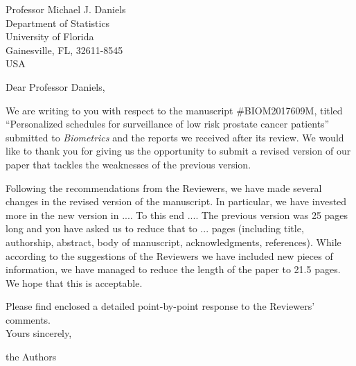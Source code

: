 \documentclass[a4paper, 11pt]{letter}
\begin{document}
\begin{letter}{Professor Michael J. Daniels\\
Department of Statistics\\
University of Florida\\
Gainesville, FL, 32611-8545\\
USA}

\address{Department of Biostatistics\\
Erasmus University Medical Center\\PO Box 2040, 3000 CA Rotterdam\\ the Netherlands
}

\opening{Dear Professor Daniels,}

We are writing to you with respect to the manuscript \#BIOM2017609M, titled ``Personalized schedules for surveillance of low risk prostate cancer patients''  submitted to \emph{Biometrics} and the reports we received after its review. We would like to thank you for giving us the opportunity to submit a revised version of our paper that tackles the weaknesses of the previous version.

Following the recommendations from the Reviewers, we have made several changes in the revised version of the manuscript. In particular, we have invested more in the new version in .... To this end .... The previous version was 25 pages long and you have asked us to reduce that to ... pages (including title, authorship, abstract, body of manuscript, acknowledgments, references). While according to the suggestions of the Reviewers we have included new pieces of information, we have managed to reduce the length of the paper to 21.5 pages. We hope that this is acceptable.

Please find enclosed a detailed point-by-point response to the Reviewers' comments.\\

Yours sincerely,

the Authors


\end{letter}
\end{document}

